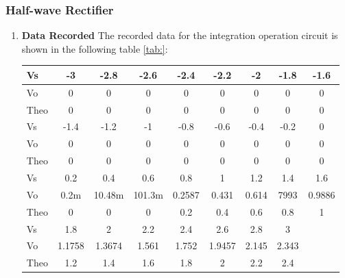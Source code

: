     \subsubsection{Half-wave Rectifier}
    \begin{enumerate}[I]
        \item \textbf{Data Recorded}\newline
            The recorded data for the integration operation circuit is shown in the following table \ref{tab:}:
            \begin{table}[H]
                \centering
                \begin{tabular}{l|cccccccc}
                    \hline
                    \toprule
                    Vs   & -3     & -2.8   & -2.6   & -2.4   & -2.2   & -2    & -1.8  & -1.6   \\
                    \midrule
                    Vo   & 0      & 0      & 0      & 0      & 0      & 0     & 0     & 0      \\
                    Theo & 0      & 0      & 0      & 0      & 0      & 0     & 0     & 0      \\
                    \midrule
                    \midrule
                    Vs   & -1.4   & -1.2   & -1     & -0.8   & -0.6   & -0.4  & -0.2  & 0      \\
                    \midrule
                    Vo   & 0      & 0      & 0      & 0      & 0      & 0     & 0     & 0      \\
                    Theo & 0      & 0      & 0      & 0      & 0      & 0     & 0     & 0      \\
                    \midrule
                    \midrule
                    Vs   & 0.2    & 0.4    & 0.6    & 0.8    & 1      & 1.2   & 1.4   & 1.6    \\
                    \midrule
                    Vo   & 0.2m   & 10.48m & 101.3m & 0.2587 & 0.431  & 0.614 & 7993  & 0.9886 \\
                    Theo & 0      & 0      & 0      & 0.2    & 0.4    & 0.6   & 0.8   & 1      \\
                    \midrule
                    \midrule
                    Vs   & 1.8    & 2      & 2.2    & 2.4    & 2.6    & 2.8   & 3     &        \\
                    \midrule
                    Vo   & 1.1758 & 1.3674 & 1.561  & 1.752  & 1.9457 & 2.145 & 2.343 &        \\
                    Theo & 1.2    & 1.4    & 1.6    & 1.8    & 2      & 2.2   & 2.4   &        \\

\end{tabular}
\end{table}
\end{enumerate}

